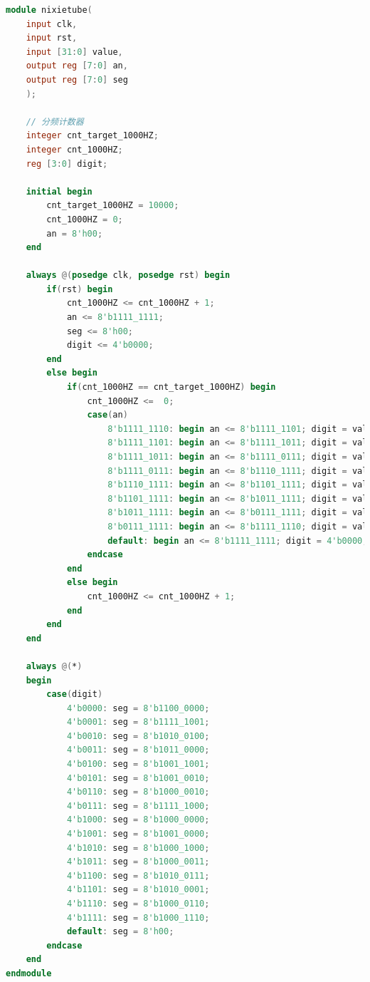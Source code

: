 \documentclass[UTF8]{article}
\begin{document}
\begin{enumerate}
\begin{lstlisting}[language=verilog]
module nixietube(
    input clk,
    input rst,
    input [31:0] value,
    output reg [7:0] an,
    output reg [7:0] seg
    );
    
    // 分频计数器
    integer cnt_target_1000HZ;
    integer cnt_1000HZ;
    reg [3:0] digit;
    
    initial begin
        cnt_target_1000HZ = 10000;
        cnt_1000HZ = 0;
        an = 8'h00;
    end
    
    always @(posedge clk, posedge rst) begin
        if(rst) begin
            cnt_1000HZ <= cnt_1000HZ + 1;
            an <= 8'b1111_1111;
            seg <= 8'h00;
            digit <= 4'b0000;
        end
        else begin
            if(cnt_1000HZ == cnt_target_1000HZ) begin
                cnt_1000HZ <=  0;
                case(an)
                    8'b1111_1110: begin an <= 8'b1111_1101; digit = value[3:0]; end
                    8'b1111_1101: begin an <= 8'b1111_1011; digit = value[7:3]; end
                    8'b1111_1011: begin an <= 8'b1111_0111; digit = value[11:7]; end
                    8'b1111_0111: begin an <= 8'b1110_1111; digit = value[15:11]; end
                    8'b1110_1111: begin an <= 8'b1101_1111; digit = value[19:15]; end
                    8'b1101_1111: begin an <= 8'b1011_1111; digit = value[23:19]; end
                    8'b1011_1111: begin an <= 8'b0111_1111; digit = value[27:23]; end
                    8'b0111_1111: begin an <= 8'b1111_1110; digit = value[31:27]; end
                    default: begin an <= 8'b1111_1111; digit = 4'b0000; end
                endcase
            end
            else begin
                cnt_1000HZ <= cnt_1000HZ + 1;
            end
        end
    end
    
    always @(*)
    begin
        case(digit)
            4'b0000: seg = 8'b1100_0000;
            4'b0001: seg = 8'b1111_1001;
            4'b0010: seg = 8'b1010_0100;
            4'b0011: seg = 8'b1011_0000;
            4'b0100: seg = 8'b1001_1001;
            4'b0101: seg = 8'b1001_0010;
            4'b0110: seg = 8'b1000_0010;
            4'b0111: seg = 8'b1111_1000;
            4'b1000: seg = 8'b1000_0000;
            4'b1001: seg = 8'b1001_0000;
            4'b1010: seg = 8'b1000_1000;
            4'b1011: seg = 8'b1000_0011;
            4'b1100: seg = 8'b1010_0111;
            4'b1101: seg = 8'b1010_0001;
            4'b1110: seg = 8'b1000_0110;
            4'b1111: seg = 8'b1000_1110;
            default: seg = 8'h00;
        endcase
    end
endmodule
	\end{lstlisting}
\end{enumerate}
\end{document}
